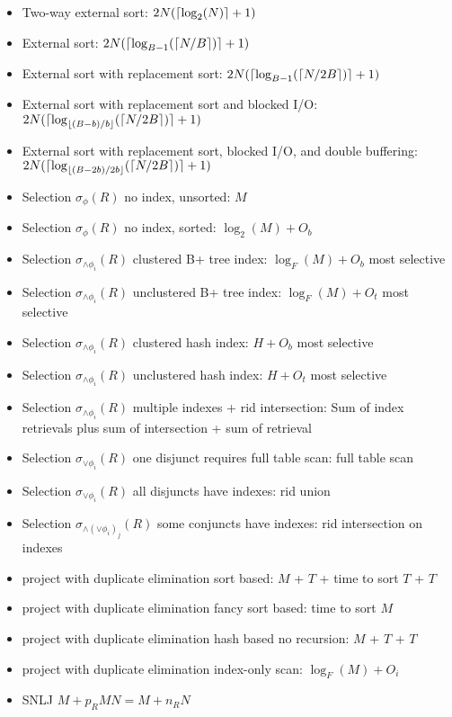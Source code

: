 \documentclass{article}
\DeclarePairedDelimiter{\ceil}{\lceil}{\rceil}
\DeclarePairedDelimiter{\floor}{\lfloor}{\rfloor}
\begin{document}
\begin{itemize}
  \item Two-way external sort: $2N(\ceil{\log_2(N)} + 1)$
  \item External sort: $2N(\ceil{\log_{B-1}(\ceil{N/B})} + 1)$
  \item External sort with replacement sort: $2N(\ceil{\log_{B-1}(\ceil{N/2B})} + 1)$
  \item External sort with replacement sort and blocked I/O: $2N(\ceil{\log_{\floor{(B-b)/b}}(\ceil{N/2B})} + 1)$
  \item External sort with replacement sort, blocked I/O, and double buffering: $2N(\ceil{\log_{\floor{(B-2b)/2b}}(\ceil{N/2B})} + 1)$
  \item Selection $\sigma_{\phi}(R)$ no index, unsorted: $M$
  \item Selection $\sigma_{\phi}(R)$ no index, sorted: $\log_2(M) + O_b$
  \item Selection $\sigma_{\land \phi_i}(R)$ clustered B+ tree index: $\log_F(M) + O_b$ most selective
  \item Selection $\sigma_{\land \phi_i}(R)$ unclustered B+ tree index: $\log_F(M) + O_t$ most selective
  \item Selection $\sigma_{\land \phi_i}(R)$ clustered hash index: $H + O_b$ most selective
  \item Selection $\sigma_{\land \phi_i}(R)$ unclustered hash index: $H + O_t$ most selective
  \item Selection $\sigma_{\land \phi_i}(R)$ multiple indexes + rid intersection: Sum of index retrievals plus sum of intersection + sum of retrieval
  \item Selection $\sigma_{\lor \phi_i}(R)$ one disjunct requires full table scan: full table scan
  \item Selection $\sigma_{\lor \phi_i}(R)$ all disjuncts have indexes: rid union
  \item Selection $\sigma_{\land (\lor \phi_i)_j}(R)$ some conjuncts have indexes: rid intersection on indexes
  \item project with duplicate elimination sort based: $M$ + $T$ + time to sort $T$ + $T$
  \item project with duplicate elimination fancy sort based: time to sort $M$
  \item project with duplicate elimination hash based no recursion: $M$ + $T$ + $T$
  \item project with duplicate elimination index-only scan: $\log_F(M) + O_i$
  \item SNLJ $M + p_R M N = M + n_RN$

\end{itemize}
\end{document}
